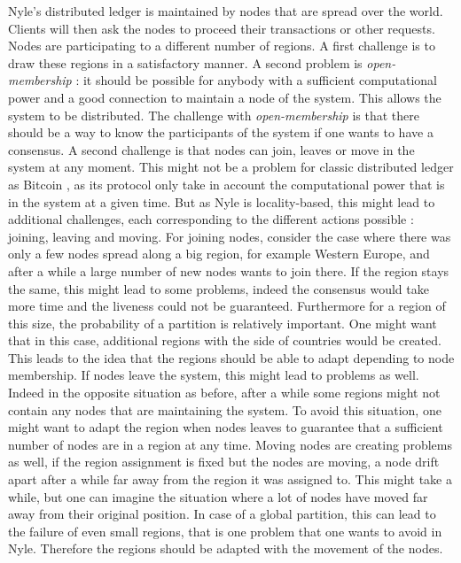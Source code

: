 \documentclass[a4paper,11pt,oneside]{report}
\begin{document}
Nyle's distributed ledger is maintained by nodes that are spread over the world.
Clients will then ask the nodes to proceed their transactions or other
requests. Nodes are participating to a different number of regions. A first
challenge is to draw these regions in a satisfactory manner. A second problem
is \textit{open-membership} : it should be possible for anybody with a
sufficient computational power and a good connection to maintain a node of the
system. This allows the system to be distributed. The challenge with
\textit{open-membership} is that there should be a way to know the participants
of the system if one wants to have a consensus.   A second challenge is that
nodes can join, leaves or move in the system at any moment. This might not be a
problem for classic distributed ledger as Bitcoin \cite{Nakamoto2009}, as its
protocol only take in account the computational power that is in the system at
a given time. But as Nyle is locality-based, this might lead to additional
challenges, each corresponding to the different actions possible : joining,
leaving and moving. For joining nodes, consider the case where there was only a
few nodes spread along a big region, for example Western Europe, and after a
while a large number of new nodes wants to join there. If the region
stays the same, this might lead to some problems, indeed the consensus would
take more time and the liveness could not be guaranteed. Furthermore for a
region of this size, the probability of a partition is relatively important.
One might want that in this case, additional regions with the side of countries would be created. This leads to the idea that the regions should be
able to adapt depending to node membership.  If nodes leave the system, this
might lead to problems as well. Indeed in the opposite situation as before,
after a while some regions might not contain any nodes that are maintaining the
system. To avoid this situation, one might want to adapt the region when nodes
leaves to guarantee that a sufficient number of nodes are in a region at any
time. Moving nodes are creating problems as well, if the region assignment is
fixed but the nodes are moving, a node drift apart after a while far away from
the region it was assigned to. This might take a while, but one can imagine the
situation where a lot of nodes have moved far away from their original
position. In case of a global partition, this can lead to the failure of even
small regions, that is one problem that one wants to avoid in Nyle. Therefore
the regions should be adapted with the movement of the nodes. 
\end{document}
